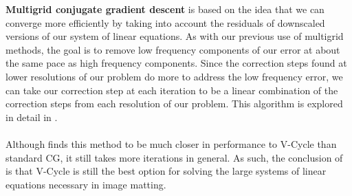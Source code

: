 \textbf{Multigrid conjugate gradient descent} is based on the idea that we can converge more efficiently by taking into account the residuals of downscaled versions of our system of linear equations. As with our previous use of multigrid methods, the goal is to remove low frequency components of our error at about the same pace as high frequency components. Since the correction steps found at lower resolutions of our problem do more to address the low frequency error, we can take our correction step at each iteration to be a linear combination of the correction steps from each resolution of our problem. This algorithm is explored in detail in \cite{pflaum08}.
\\\\
Although \cite{lee14} finds this method to be much closer in performance to V-Cycle than standard CG, it still takes more iterations in general. As such, the conclusion of \cite{lee14} is that V-Cycle is still the best option for solving the large systems of linear equations necessary in image matting.
